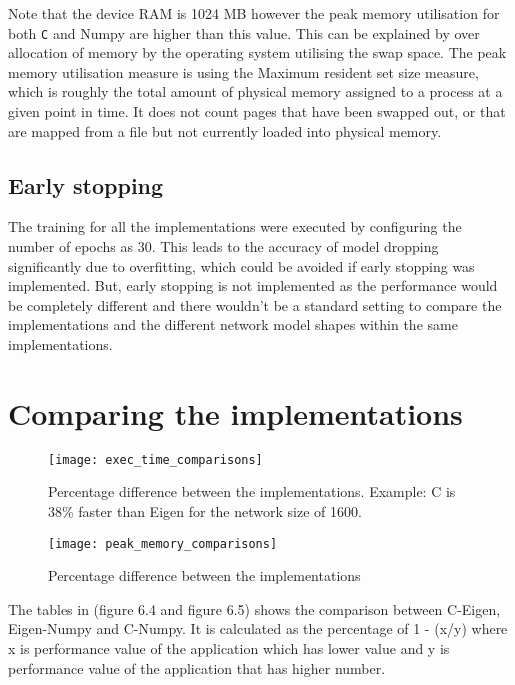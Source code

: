 
Note that the device RAM is 1024 MB however the peak memory utilisation for both \texttt{C} and Numpy are higher than this value. This can be explained by over allocation of memory by the operating system utilising the swap space. The peak memory utilisation measure is using the Maximum resident set size measure, which is roughly the total amount of physical memory assigned to a process at a given point in time. It does not count pages that have been swapped out, or that are mapped from a file but not currently loaded into physical memory.

\subsection{Early stopping}

The training for all the implementations were executed by configuring the number of epochs as 30. This leads to the accuracy of model dropping significantly due to overfitting, which could be avoided if early stopping was implemented. But, early stopping is not implemented as the performance would be completely different and there wouldn't be a standard setting to compare the implementations and the different network model shapes within the same implementations.

\section{Comparing the implementations}

\begin{figure}[!ht]
	\centering
	\texttt{[image: exec\_time\_comparisons]}
	\caption[Execution Time vs Model Parameters]{Percentage difference between the implementations. Example: C is 38\% faster than Eigen for the network size of 1600.}
\end{figure}

\begin{figure}[ht]
	\centering
	\texttt{[image: peak\_memory\_comparisons]}
	\caption[Peak Memory Utilisation]{Percentage difference between the implementations}
\end{figure}

The tables in (figure 6.4 and figure 6.5) shows the comparison between C-Eigen, Eigen-Numpy and C-Numpy. It is calculated as the percentage of 1 - (x/y) where x is performance value of the application which has lower value and y is performance value of the application that has higher number.

